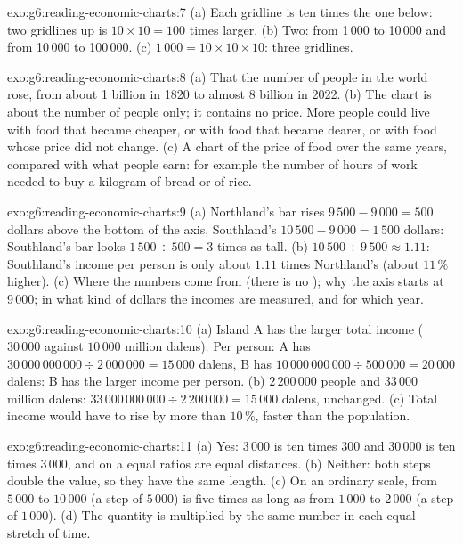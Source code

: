 \begin{solution}{exo:g6:reading-economic-charts:7}
(a) Each gridline is ten times the one below: two gridlines up is
$10 \times 10 = 100$ times larger. (b) Two: from 1\,000 to 10\,000 and from
10\,000 to 100\,000. (c) $1\,000 = 10 \times 10 \times 10$: three gridlines.
\end{solution}

\begin{solution}{exo:g6:reading-economic-charts:8}
(a) That the number of people in the world rose, from about 1 billion in 1820
to almost 8 billion in 2022. (b) The chart is about the number of people only;
it contains no price. More people could live with food that became cheaper,
or with food that became dearer, or with food whose price did not change.
(c) A chart of the price of food over the same years, compared with what
people earn: for example the number of hours of work needed to buy a kilogram
of bread or of rice.
\end{solution}

\begin{solution}{exo:g6:reading-economic-charts:9}
(a) Northland's bar rises $9\,500 - 9\,000 = 500$ dollars above the bottom of
the axis, Southland's $10\,500 - 9\,000 = 1\,500$ dollars: Southland's bar looks
$1\,500 \div 500 = 3$ times as tall. (b) $10\,500 \div 9\,500 \approx 1.11$:
Southland's income per person is only about $1.11$ times Northland's (about
$11\,\%$ higher). (c) Where the numbers come from (there is no );
why the axis starts at 9\,000; in what kind of dollars the incomes are
measured, and for which year.
\end{solution}

\begin{solution}{exo:g6:reading-economic-charts:10}
(a) Island A has the larger total income ($30\,000$ against $10\,000$ million
dalens). Per person: A has $30\,000\,000\,000 \div 2\,000\,000 = 15\,000$ dalens,
B has $10\,000\,000\,000 \div 500\,000 = 20\,000$ dalens: B has the larger
income per person. (b) $2\,200\,000$ people and $33\,000$ million dalens:
$33\,000\,000\,000 \div 2\,200\,000 = 15\,000$ dalens, unchanged. (c) Total
income would have to rise by more than $10\,\%$, faster than the population.
\end{solution}

\begin{solution}{exo:g6:reading-economic-charts:11}
(a) Yes: $3\,000$ is ten times $300$ and $30\,000$ is ten times $3\,000$, and on a
 equal ratios are equal distances. (b) Neither: both steps
double the value, so they have the same length. (c) On an ordinary scale, from
$5\,000$ to $10\,000$ (a step of $5\,000$) is five times as long as from $1\,000$ to
$2\,000$ (a step of $1\,000$). (d) The quantity is multiplied by the same number
in each equal stretch of time.
\end{solution}

